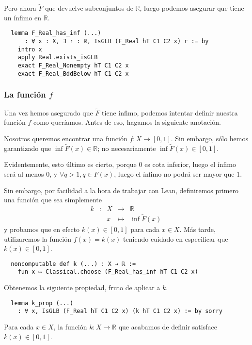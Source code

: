 Pero ahora $\tilde{F}$ que devuelve subconjuntos de $\mathbb{R}$, luego podemos asegurar que tiene un ínfimo en $\mathbb{R}$.

\begin{lstlisting}
  lemma F_Real_has_inf (...)
      : ∀ x : X, ∃ r : ℝ, IsGLB (F_Real hT C1 C2 x) r := by
    intro x
    apply Real.exists_isGLB
    exact F_Real_Nonempty hT C1 C2 x
    exact F_Real_BddBelow hT C1 C2 x
\end{lstlisting}


\subsubsection{La función $f$}

Una vez hemos asegurado que $\tilde{F}$ tiene ínfimo, podemos intentar definir nuestra función $f$ como queríamos. Antes de eso, hagamos la siguiente anotación.

Nosotros queremos encontrar una función $f : X \to [0, 1]$. Sin embargo, sólo hemos garantizado que $\inf \tilde{F}(x) \in \mathbb{R}$; no necesariamente $\inf \tilde{F}(x) \in [0, 1]$.

Evidentemente, esto último es cierto, porque $0$ es cota inferior, luego el ínfimo será al menos $0$, y $\forall q>1, q \in F(x)$, luego el ínfimo no podrá ser mayor que $1$.

Sin embargo, por facilidad a la hora de trabajar con Lean, definiremos primero una función que sea simplemente
$$
\begin{array}{rcrcl}
  k & : & X & \longrightarrow & \mathbb{R} \\
    & & x & \longmapsto & \inf \tilde{F}(x)
\end{array}
$$
y probamos que en efecto $k(x) \in [0, 1]$ para cada $x\in X$. Más tarde, utilizaremos la función $f(x) = k(x)$ teniendo cuidado en especificar que $k(x) \in [0, 1]$.

\begin{lstlisting}
  noncomputable def k (...) : X → ℝ :=
    fun x ↦ Classical.choose (F_Real_has_inf hT C1 C2 x)
\end{lstlisting}

Obtenemos la siguiente propiedad, fruto de aplicar  a $k$.

\begin{lstlisting}
  lemma k_prop (...)
    : ∀ x, IsGLB (F_Real hT C1 C2 x) (k hT C1 C2 x) := by sorry
\end{lstlisting}

\begin{lemma}
  Para cada $x \in X$, la función $k : X \to \mathbb{R}$ que acabamos de definir satisface $k(x) \in [0, 1]$.
\end{lemma}

